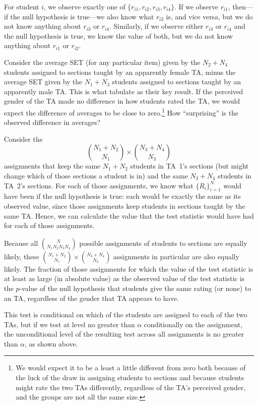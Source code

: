 \documentclass[12pt]{article}
\newcommand{\beq}{\begin{equation}}
\newcommand{\eeq}{\end{equation}}
\begin{document}
For student $i$, we observe exactly one of $\{r_{i1}, r_{i2}, r_{i3}, r_{i4}\}$.
If we observe $r_{i1}$, then---if the null hypothesis is true---we also know what $r_{i2}$ is,
and vice versa, but we do not know anything about $r_{i3}$ or $r_{i4}$.
Similarly, if we observe either $r_{i3}$ or $r_{i4}$ and the null hypothesis is true,
we know the value of both, but we do not know anything about $r_{i1}$ or $r_{i2}$.

Consider the average SET (for any particular item)
given by the $N_2 + N_4$ students
assigned to sections taught by an apparently female TA, minus the 
average SET given by the $N_1 + N_3$ students
assigned to sections taught by an apparently male TA.
This is what \cite{MacNell2014} tabulate as their key result.
If the perceived gender of the TA made no difference in how students rated 
the TA, we would expect the difference of averages to be close to
zero.\footnote{%
  We would expect it to be a least a little different from zero both because of the luck of the draw
  in assigning students to sections and because students might rate the two TAs
  differently, regardless of the TA's perceived gender, and the groups are not all the same size.
}
How ``surprising'' is the observed difference in averages?

Consider the
\beq
  {{N_1 + N_2} \choose {N_1}} \times {{N_3+N_4} \choose {N_3}}
\eeq
assignments that keep the same $N_1 + N_2$ students in TA~1's
sections (but might change which of those sections a student is in) 
and the same $N_3 + N_4$ students in TA~2's sections.
For each of those assignments, we know what $\{R_i\}_{i=1}^N$ would
have been if the null hypothesis is true: each would be exactly the same
as its observed value, since those
assignments keep students in sections taught by the same TA.
Hence, we can calculate the value that the test statistic would have had for each
of those assignments.

Because all ${N}\choose{N_1 N_2 N_3 N_4}$ possible assignments of students
to sections are equally likely, these 
${{N_1 + N_2} \choose {N_1}} \times {{N_3+N_4} \choose {N_3}}$ 
assignments in particular are also equally likely.
The fraction of those assignments for which the value of the test statistic
is at least as large (in absolute value) as the observed value of the test statistic
is the $p$-value of the null hypothesis that students give the same rating (or none) to
an TA, regardless of the gender that TA appears to have.

This test is conditional on which of the students are assigned to each of the two 
TAs, but if we test at level no greater than $\alpha$ conditionally on the
assignment, the unconditional level of the resulting test across all assignments is no 
greater than $\alpha$, as shown above.
\end{document}
